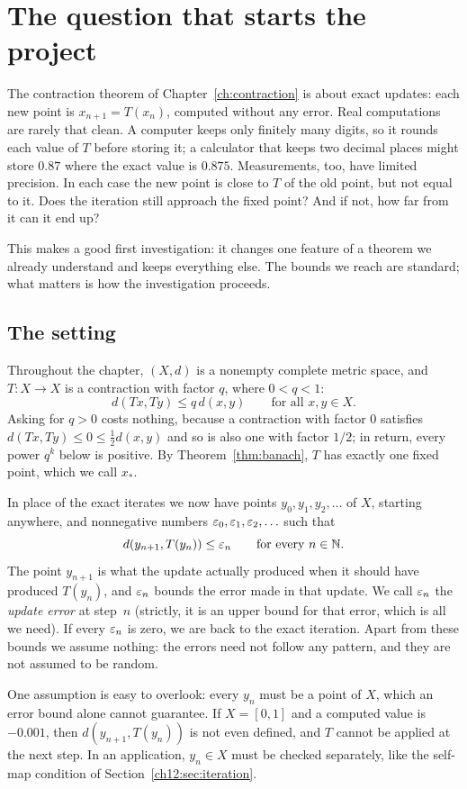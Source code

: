 \section{The question that starts the project}\label{ch18:sec:question}
The contraction theorem of Chapter~\ref{ch:contraction} is about exact updates: each new point is $x_{n+1}=T(x_n)$, computed without any error. Real computations are rarely that clean. A computer keeps only finitely many digits, so it rounds each value of $T$ before storing it; a calculator that keeps two decimal places might store $0.87$ where the exact value is $0.875$. Measurements, too, have limited precision. In each case the new point is close to $T$ of the old point, but not equal to it. Does the iteration still approach the fixed point? And if not, how far from it can it end up?

This makes a good first investigation: it changes one feature of a theorem we already understand and keeps everything else. The bounds we reach are standard; what matters is how the investigation proceeds.

\subsection*{The setting}
Throughout the chapter, $(X,d)$ is a nonempty complete metric space, and $T:X\to X$ is a contraction with factor $q$, where $0<q<1$:
\[
 d(Tx,Ty)\le q\,d(x,y)\qquad\text{for all }x,y\in X.
\]
Asking for $q>0$ costs nothing, because a contraction with factor $0$ satisfies $d(Tx,Ty)\le0\le\frac12d(x,y)$ and so is also one with factor $1/2$; in return, every power $q^k$ below is positive. By Theorem~\ref{thm:banach}, $T$ has exactly one fixed point, which we call $x_*$.

In place of the exact iterates we now have points $y_0,y_1,y_2,\ldots$ of $X$, starting anywhere, and nonnegative numbers $\varepsilon_0,\varepsilon_1,\varepsilon_2,\ldots$ such that
\[
 d(y_{n+1},T(y_n))\le\varepsilon_n\qquad\text{for every }n\in\mathbb N.
\]
The point $y_{n+1}$ is what the update actually produced when it should have produced $T(y_n)$, and $\varepsilon_n$ bounds the error made in that update. We call $\varepsilon_n$ the \emph{update error} at step~$n$ (strictly, it is an upper bound for that error, which is all we need). If every $\varepsilon_n$ is zero, we are back to the exact iteration. Apart from these bounds we assume nothing: the errors need not follow any pattern, and they are not assumed to be random.

One assumption is easy to overlook: every $y_n$ must be a point of $X$, which an error bound alone cannot guarantee. If $X=[0,1]$ and a computed value is $-0.001$, then $d(y_{n+1},T(y_n))$ is not even defined, and $T$ cannot be applied at the next step. In an application, $y_n\in X$ must be checked separately, like the self-map condition of Section~\ref{ch12:sec:iteration}.
